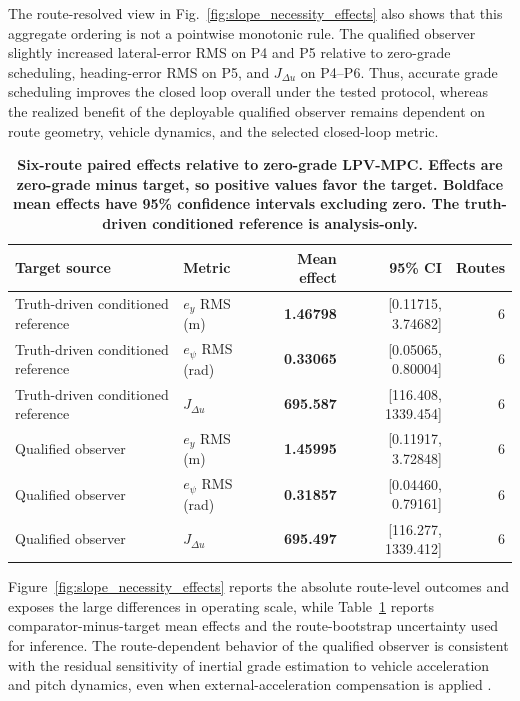 \documentclass{ieeeaccess}
\newcommand{\citep}[1]{\cite{#1}}
\begin{document}
The route-resolved view in Fig.~\ref{fig:slope_necessity_effects} also shows that this aggregate ordering is not a pointwise monotonic rule. The qualified observer slightly increased lateral-error RMS on P4 and P5 relative to zero-grade scheduling, heading-error RMS on P5, and $J_{\Delta u}$ on P4--P6. Thus, accurate grade scheduling improves the closed loop overall under the tested protocol, whereas the realized benefit of the deployable qualified observer remains dependent on route geometry, vehicle dynamics, and the selected closed-loop metric.

\begin{table}[!t]
\centering
\caption{\textbf{Six-route paired effects relative to zero-grade LPV-MPC. Effects are zero-grade minus target, so positive values favor the target. Boldface mean effects have 95\% confidence intervals excluding zero. The truth-driven conditioned reference is analysis-only.}}
\label{tab:slope_necessity_effects}
\setlength{\tabcolsep}{3pt}
\begin{tabular}{|l|l|r|r|r|}
\hline
Target source & Metric & Mean effect & 95\% CI & Routes \\
\hline
Truth-driven conditioned reference & $e_y$ RMS (m) & \textbf{1.46798} & [0.11715, 3.74682] & 6 \\
Truth-driven conditioned reference & $e_\psi$ RMS (rad) & \textbf{0.33065} & [0.05065, 0.80004] & 6 \\
Truth-driven conditioned reference & $J_{\Delta u}$ & \textbf{695.587} & [116.408, 1339.454] & 6 \\
Qualified observer & $e_y$ RMS (m) & \textbf{1.45995} & [0.11917, 3.72848] & 6 \\
Qualified observer & $e_\psi$ RMS (rad) & \textbf{0.31857} & [0.04460, 0.79161] & 6 \\
Qualified observer & $J_{\Delta u}$ & \textbf{695.497} & [116.277, 1339.412] & 6 \\
\hline
\end{tabular}
\end{table}

Figure~\ref{fig:slope_necessity_effects} reports the absolute route-level outcomes and exposes the large differences in operating scale, while Table~\ref{tab:slope_necessity_effects} reports comparator-minus-target mean effects and the route-bootstrap uncertainty used for inference. The route-dependent behavior of the qualified observer is consistent with the residual sensitivity of inertial grade estimation to vehicle acceleration and pitch dynamics, even when external-acceleration compensation is applied \citep{Liu2023RoadSlopeAAIMM}.
\end{document}
